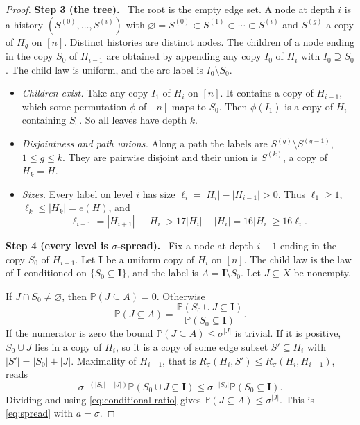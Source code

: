 \documentclass[11pt]{article}
\numberwithin{equation}{section}
\theoremstyle{remark}
\newcommand{\PP}{\mathbb P}
\newcommand{\step}[1]{\par\medskip\noindent\textbf{#1}\ }
\begin{document}
\begin{proof}
\step{Step 3 (the tree).} The root is the empty edge set. A node at
depth $i$ is a history $(S^{(0)},\ldots,S^{(i)})$ with
$\varnothing=S^{(0)}\subset S^{(1)}\subset\cdots\subset S^{(i)}$ and
$S^{(g)}$ a copy of $H_g$ on $[n]$. Distinct histories are distinct
nodes. The children of a node ending in the copy $S_0$ of $H_{i-1}$ are
obtained by appending any copy $I_0$ of $H_i$ with $I_0\supseteq S_0$.
The child law is uniform, and the arc label is $I_0\setminus S_0$.
\begin{itemize}[leftmargin=2em,itemsep=2pt]
 \item \emph{Children exist.} Take any copy $I_1$ of $H_i$ on $[n]$. It
 contains a copy of $H_{i-1}$, which some permutation $\phi$ of $[n]$
 maps to $S_0$. Then $\phi(I_1)$ is a copy of $H_i$ containing $S_0$.
 So all leaves have depth $k$.
 \item \emph{Disjointness and path unions.} Along a path the labels are
 $S^{(g)}\setminus S^{(g-1)}$, $1\le g\le k$. They are pairwise disjoint
 and their union is $S^{(k)}$, a copy of $H_k=H$.
 \item \emph{Sizes.} Every label on level $i$ has size
 $\ell_i=|H_i|-|H_{i-1}|>0$. Thus $\ell_1\ge1$,
 $\ell_k\le|H_k|=e(H)$, and
 \[
  \ell_{i+1}=|H_{i+1}|-|H_i|>17|H_i|-|H_i|=16|H_i|\ge16\ell_i .
 \]
\end{itemize}

\step{Step 4 (every level is $\sigma$-spread).} Fix a node at depth
$i-1$ ending in the copy $S_0$ of $H_{i-1}$. Let $\boldsymbol I$ be a
uniform copy of $H_i$ on $[n]$. The child law is the law of
$\boldsymbol I$ conditioned on $\{S_0\subseteq\boldsymbol I\}$, and the
label is $A=\boldsymbol I\setminus S_0$. Let $J\subseteq X$ be nonempty.

If $J\cap S_0\ne\varnothing$, then $\PP(J\subseteq A)=0$. Otherwise
\begin{equation}\label{eq:conditional-ratio}
 \PP(J\subseteq A)=
 \frac{\PP(S_0\cup J\subseteq\boldsymbol I)}
      {\PP(S_0\subseteq\boldsymbol I)}.
\end{equation}
If the numerator is zero the bound $\PP(J\subseteq A)\le\sigma^{|J|}$ is
trivial. If it is positive, $S_0\cup J$ lies in a copy of $H_i$, so it
is a copy of some edge subset $S'\subseteq H_i$ with
$|S'|=|S_0|+|J|$. Maximality of $H_{i-1}$, that is
$R_\sigma(H_i,S')\le R_\sigma(H_i,H_{i-1})$, reads
\[
 \sigma^{-(|S_0|+|J|)}\PP(S_0\cup J\subseteq\boldsymbol I)
 \le \sigma^{-|S_0|}\PP(S_0\subseteq\boldsymbol I).
\]
Dividing and using \eqref{eq:conditional-ratio} gives
$\PP(J\subseteq A)\le\sigma^{|J|}$. This is \eqref{eq:spread} with
$a=\sigma$.
\end{proof}
\end{document}
